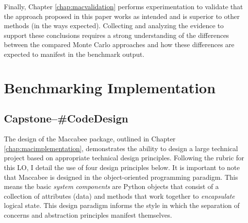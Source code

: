 \documentclass[../main.tex]{subfiles}
\begin{document}
Finally, Chapter \ref{chap:macvalidation} performs experimentation to validate that the approach proposed in this paper works as intended and is superior to other methods (in the ways expected). Collecting and analyzing the evidence to support these conclusions requires a strong understanding of the differences between the compared Monte Carlo approaches and how these differences are expected to manifest in the benchmark output.


\section{Benchmarking Implementation}

\subsection*{\textbf{Capstone--\#CodeDesign}}
\label{lo:CodeDesign}

The design of the Maccabee package, outlined in Chapter \ref{chap:macimplementation}, demonstrates the ability to design a large technical project based on appropriate technical design principles. Following the rubric for this LO, I detail the use of four design principles below. It is important to note that Maccabee is designed in the object-oriented programming paradigm. This means the basic \textit{system components} are Python objects that consist of a collection of attributes (data) and methods that work together to \textit{encapsulate} logical state. This design paradigm informs the style in which the separation of concerns and abstraction principles manifest themselves.
\end{document}

